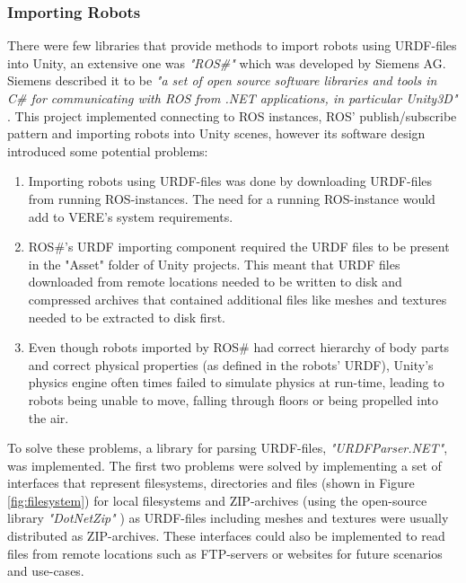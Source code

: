 \subsubsection{Importing Robots}
There were few libraries that provide methods to import robots using URDF-files into Unity, an extensive one was \emph{"ROS\#"} which was developed by Siemens AG. Siemens described it to be \textit{"a set of open source software libraries and tools in C\# for communicating with ROS from .NET applications, in particular Unity3D"} \cite{RosSharp}. This project implemented connecting to ROS instances, ROS' publish/subscribe pattern and importing robots into Unity scenes, however its software design introduced some potential problems: 
\begin{enumerate}
    \item Importing robots using URDF-files was done by downloading URDF-files from running ROS-instances. The need for a running ROS-instance would add to \ac{VERE}'s system requirements.
    \item ROS\#'s URDF importing component required the URDF files to be present in the "Asset" folder of Unity projects. This meant that URDF files downloaded from remote locations needed to be written to disk and compressed archives that contained additional files like meshes and textures needed to be extracted to disk first.
    \item Even though robots imported by ROS\# had correct hierarchy of body parts and correct physical properties (as defined in the robots' URDF), Unity's physics engine often times failed to simulate physics at run-time, leading to robots being unable to move, falling through floors or being propelled into the air.
\end{enumerate}
To solve these problems, a library for parsing URDF-files, \emph{"URDFParser.NET"}, was implemented. The first two problems were solved by implementing a set of interfaces that represent filesystems, directories and files (shown in Figure \ref{fig:filesystem}) for local filesystems and ZIP-archives (using the open-source library \emph{"DotNetZip"} \cite{DotNetZip}) as URDF-files including meshes and textures were usually distributed as ZIP-archives. These interfaces could also be implemented to read files from remote locations such as FTP-servers or websites for future scenarios and use-cases.
